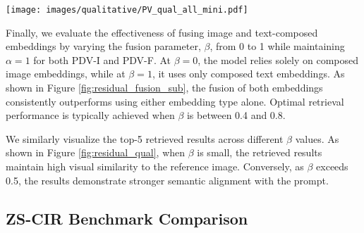\begin{figure*}[!tbh]
	\centering
	\texttt{[image: images/qualitative/PV\_qual\_all\_mini.pdf]}
	\caption{Visualisation of the impact of $\alpha$/$\beta$ scaling on top-5 retrieval results. CIReVL with ViT-B-32 Clip model is the baseline method used. Representative examples with prompts from three datasets: FashionIQ (left), CIRR (middle), and CIRCO (right) are shown at the top. \textbf{\textcolor{boxgreen}{Green}} and \textbf{\textcolor{boxblue}{blue}} bounding boxes indicate true positives and near-true positives, respectively.}
	\label{fig:residual_qual}
	
\end{figure*}

\label{sec:exp3}
Finally, we evaluate the effectiveness of fusing image and text-composed embeddings by varying the fusion parameter, $\beta$, from 0 to 1 while maintaining $\alpha=1$
for both PDV-I and PDV-F. At $\beta=0$, the model relies solely on composed image embeddings, while at $\beta=1$, it uses only composed text embeddings. As shown in Figure \ref{fig:residual_fusion_sub}, the fusion of both embeddings consistently outperforms using either embedding type alone. Optimal retrieval performance is typically achieved when $\beta$ is between 0.4 and 0.8.

We similarly visualize the top-5 retrieved results across different $\beta$ values. As shown in Figure \ref{fig:residual_qual}, when $\beta$ is small, the retrieved results maintain high visual similarity to the reference image. Conversely, as $\beta$ exceeds 0.5, the results demonstrate stronger semantic alignment with the prompt.



\subsection{ZS-CIR Benchmark Comparison}






